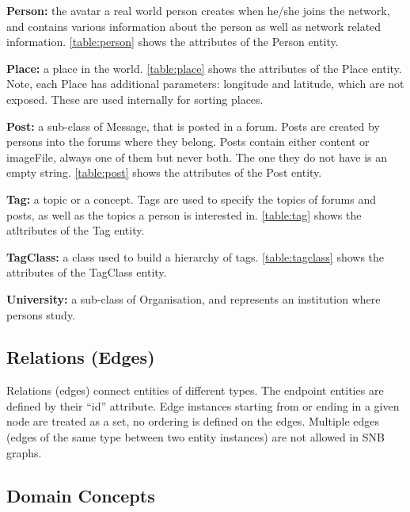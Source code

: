 {\flushleft \textbf{Person:}} the avatar a real world person creates
when he/she joins the network, and contains various information about the
person as well as network related information. \autoref{table:person} shows
the attributes of the Person entity.



{\flushleft \textbf{Place:}} a place in the world.
\autoref{table:place} shows the attributes of the Place entity. Note, each Place has additional parameters: longitude and latitude, which are not exposed. These are used internally for sorting places.



{\flushleft \textbf{Post:}} a sub-class of Message, that is posted in a
forum. Posts are created by persons into the forums where they belong.
Posts contain either content or imageFile, always one of them but never both.
The one they do not have is an empty string.
\autoref{table:post} shows the attributes of the Post entity.



{\flushleft \textbf{Tag:}} a topic or a concept. Tags are used to
specify the topics of forums and posts, as well as the topics a person is
interested in. \autoref{table:tag} shows the atltributes of the Tag entity.



{\flushleft \textbf{TagClass:}} a class used to build a hierarchy of tags. \autoref{table:tagclass} shows the attributes of the TagClass entity.



{\flushleft \textbf{University:}} a sub-class of Organisation,
and represents an institution where persons study.

\subsection{Relations (Edges)}

Relations (edges) connect entities of different types. The endpoint entities are defined by their ``id'' attribute.
Edge instances starting from or ending in a given node are treated as a set, \ie no ordering is defined on the edges.
Multiple edges (\ie edges of the same type between two entity instances) are not allowed in SNB graphs.



\subsection{Domain Concepts}

